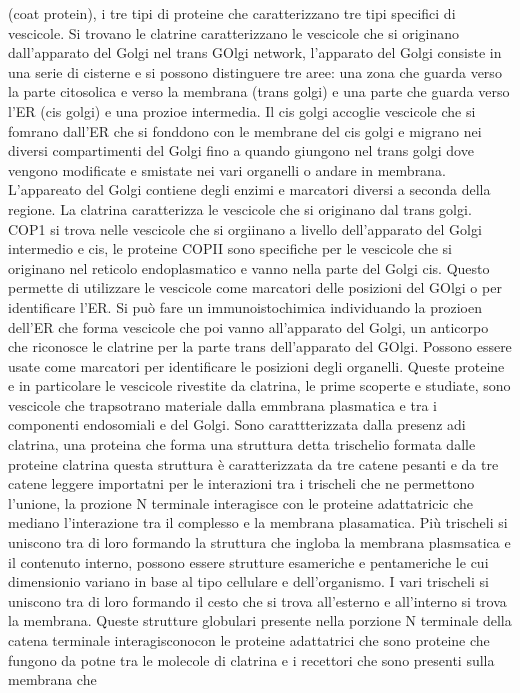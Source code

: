 (coat protein), i tre tipi di proteine che caratterizzano tre tipi specifici di vescicole. Si trovano le clatrine caratterizzano le vescicole che si originano dall'apparato del Golgi nel
trans GOlgi network, l'apparato del Golgi consiste in una serie di cisterne e si possono distinguere tre aree: una zona che guarda verso la parte citosolica e verso la membrana (trans
golgi) e una parte che guarda verso l'ER (cis golgi) e una prozioe intermedia. Il cis golgi accoglie vescicole che si fomrano dall'ER che si fonddono con le membrane del cis golgi e 
migrano nei diversi compartimenti del Golgi fino a quando giungono nel trans golgi dove vengono modificate e smistate nei vari organelli o andare in membrana. L'appareato del Golgi 
contiene degli enzimi e marcatori diversi a seconda della regione. La clatrina caratterizza le vescicole che si originano dal trans golgi. COP1 si trova nelle vescicole che si orgiinano
a livello dell'apparato del Golgi intermedio e cis, le proteine COPII sono specifiche per le vescicole che si originano nel reticolo endoplasmatico e vanno nella parte del Golgi cis. 
Questo permette di utilizzare le vescicole come marcatori delle posizioni del GOlgi o per identificare l'ER. Si pu\`o fare un immunoistochimica individuando la prozioen dell'ER che forma
vescicole che poi vanno all'apparato del Golgi, un anticorpo che riconosce le clatrine per la parte trans dell'apparato del GOlgi. Possono essere usate come marcatori per identificare 
le posizioni degli organelli. Queste proteine e in particolare le vescicole rivestite da clatrina, le prime scoperte e studiate, sono vescicole che trapsotrano materiale dalla emmbrana
plasmatica e tra i componenti endosomiali e del Golgi. Sono carattterizzata dalla presenz adi clatrina, una proteina che forma una struttura detta trischelio formata dalle proteine 
clatrina questa struttura \`e caratterizzata da tre catene pesanti e da tre catene leggere importatni per le interazioni tra i trischeli che ne permettono l'unione, la prozione N 
terminale interagisce con le proteine adattatricic che mediano l'interazione tra il complesso e la membrana plasamatica. Pi\`u trischeli si uniscono tra di loro formando la struttura che
ingloba la membrana plasmsatica e il contenuto interno, possono essere strutture esameriche e pentameriche le cui dimensionio variano in base al tipo cellulare e dell'organismo. I 
vari trischeli si uniscono tra di loro formando il cesto che si trova all'esterno e all'interno si trova la membrana. Queste strutture globulari presente nella porzione N terminale 
della catena terminale interagisconocon le proteine adattatrici che sono proteine che fungono da potne tra le molecole di clatrina e i recettori che sono presenti sulla membrana che 
